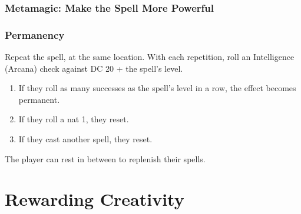 \documentclass[twocolumn]{dndbook}
\begin{document}

\subsection{Metamagic: Make the Spell More Powerful}

\subsection{Permanency}


Repeat the spell, at the same location. With each repetition, roll an Intelligence (Arcana) check against DC 20 + the spell's level.
\begin{enumerate}
	\item If they roll as many successes as the spell's level in a row, the effect becomes permanent.
	\item If they roll a nat 1, they reset.
	\item If they cast another spell, they reset.
\end{enumerate}

The player can rest in between to replenish their spells.








\chapter{Rewarding Creativity}

\end{document}
